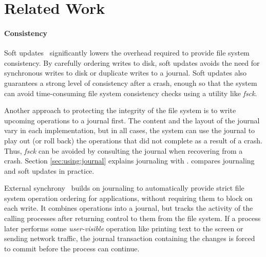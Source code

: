 \section{Related Work}
\label{sec:related}

\paragraph{Consistency}

Soft updates~\cite{ganger00soft} significantly lowers the overhead required to
provide file system consistency. By carefully ordering writes to disk, soft
updates avoids the need for synchronous writes to disk or duplicate writes to
a journal. Soft updates also guarantees a strong level of consistency after a
crash, enough so that the system can avoid time-consuming file system
consistency checks using a utility like \emph{fsck}. 

Another approach to protecting the integrity of the file system is to write
upcoming operations to a journal first. The content and the layout of the
journal vary in each implementation, but in all cases, the system can use the
journal to play out (or roll back) the operations that did not complete as a
result of a crash. Thus, \emph{fsck} can be avoided by consulting the journal
when recovering from a crash. Section \ref{sec:using:journal} explains
journaling with \chdescs. \cite{seltzer00journaling} compares journaling and
soft updates in practice.

External synchrony~\cite{nightingale06rethink} builds on journaling to
automatically provide strict file system operation ordering for applications,
without requiring them to block on each write. It combines operations into a
journal, but tracks the activity of the calling processes after returning
control to them from the file system. If a process later performs some
\emph{user-visible} operation like printing text to the screen or sending
network traffic, the journal transaction containing the changes is forced to
commit before the process can continue.

\cite{sivathanu05ensuring}

